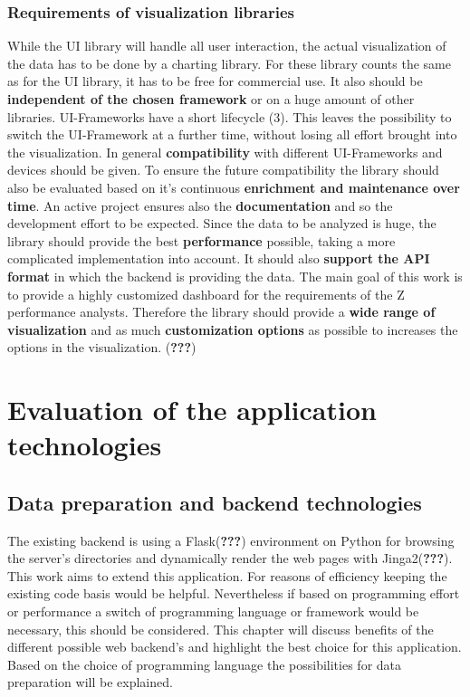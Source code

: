 \documentclass[american,a4paper,oneside,,tablecaptionabove]{scrbook}
\begin{document}
\subsection{Requirements of visualization
libraries}\label{requirements-of-visualization-libraries}

While the UI library will handle all user interaction, the actual
visualization of the data has to be done by a charting library. For
these library counts the same as for the UI library, it has to be free
for commercial use. It also should be \textbf{independent of the chosen
framework} or on a huge amount of other libraries. UI-Frameworks have a
short lifecycle (3). This leaves the possibility to switch the
UI-Framework at a further time, without losing all effort brought into
the visualization. In general \textbf{compatibility} with different
UI-Frameworks and devices should be given. To ensure the future
compatibility the library should also be evaluated based on it's
continuous \textbf{enrichment and maintenance over time}. An active
project ensures also the \textbf{documentation} and so the development
effort to be expected. Since the data to be analyzed is huge, the
library should provide the best \textbf{performance} possible, taking a
more complicated implementation into account. It should also
\textbf{support the API format} in which the backend is providing the
data. The main goal of this work is to provide a highly customized
dashboard for the requirements of the Z performance analysts. Therefore
the library should provide a \textbf{wide range of visualization} and as
much \textbf{customization options} as possible to increases the options
in the visualization. ({\textbf{???}})

\chapter{Evaluation of the application
technologies}\label{evaluation-of-the-application-technologies}

\section{Data preparation and backend
technologies}\label{data-preparation-and-backend-technologies}

The existing backend is using a Flask({\textbf{???}}) environment on
Python for browsing the server's directories and dynamically render the
web pages with Jinga2({\textbf{???}}). This work aims to extend this
application. For reasons of efficiency keeping the existing code basis
would be helpful. Nevertheless if based on programming effort or
performance a switch of programming language or framework would be
necessary, this should be considered. This chapter will discuss benefits
of the different possible web backend's and highlight the best choice
for this application. Based on the choice of programming language the
possibilities for data preparation will be explained.
\end{document}

